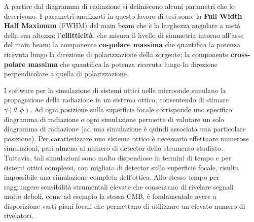 \documentclass[12pt,a4paper,final]{report}			%
\begin{document}

A partire dal diagramma di radiazione si definiscono alcuni parametri che lo descrivono. I parametri analizzati in questo lavoro di tesi sono: la \textbf{Full Width Half Maximum} (FWHM) del main beam che è la larghezza angolare a metà della sua altezza; l'\textbf{ellitticità}, che misura il livello di simmetria intorno all'asse del main beam; la componente \textbf{co-polare massima} che quantifica la potenza ricevuta lungo la direzione di polarizzazione della sorgente; la componente \textbf{cross-polare massima} che quantifica la potenza ricevuta lungo la direzione perpendicolare a quella di polarizzazione.


I software per la simulazione di sistemi ottici nelle microonde simulano la propagazione della radiazione in un sistema ottico, consentendo di stimare $\gamma(\theta, \phi)$.
Ad ogni posizione sulla superficie focale corrisponde uno specifico diagramma di radiazione e ogni simulazione permette di valutare un solo diagramma di radiazione (ad una simulazione è quindi associata una particolare posizione). Per caratterizzare uno sistema ottico è necessario effettuare numerose simulazioni, pari almeno al numero di detector dello strumento studiato. 
Tuttavia, tali simulazioni sono molto dispendiose in termini di tempo e per sistemi ottici complessi, con migliaia di detector sulla superficie focale, risulta impossibile una simulazione completa dell'ottica.
Allo stesso tempo per raggiungere sensibilità strumentali elevate che consentano di rivelare segnali molto deboli, come ad esempio la stessa CMB, è fondamentale avere a disposizione vasti piani focali che permettano di utilizzare un elevato numero di rivelatori.
\end{document}
